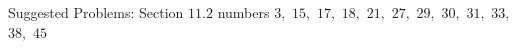 \documentclass[letterpaper, twoside, 12pt]{book}
\theoremstyle{definition}
\theoremstyle{definition}
\newtheorem{observation}[theorem]{Observation}
\begin{document}
\vfill

\noindent Suggested Problems: Section $11.2$ numbers $3,$ $15,$ $17,$ $18,$ $21,$ $27,$ $29,$ $30,$ $31,$ $33,$ $38,$ $45$




\end{document}
